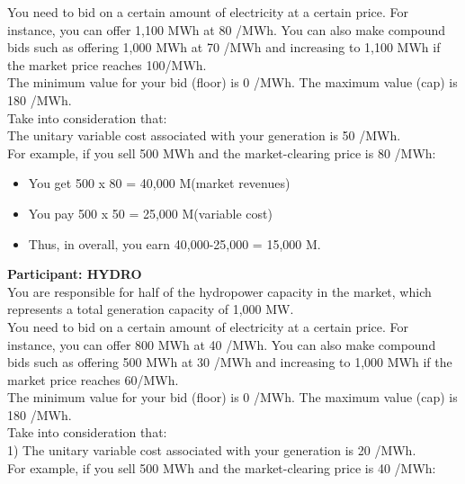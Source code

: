 \documentclass[3p]{elsarticle} %
\begin{document}
You need to bid on a certain amount of electricity at a certain price. For instance, you can offer 1,100 MWh at 80 \EUR/MWh. You can also make compound bids such as offering 1,000 MWh at 70 \EUR/MWh and increasing to 1,100 MWh if the market price reaches 100\EUR/MWh.\\

The minimum value for your bid (floor) is 0 \EUR/MWh. The maximum value (cap) is 180 \EUR/MWh. \\

Take into consideration that: \\

The unitary variable cost associated with your generation is 50 \EUR/MWh.\\

For example, if you sell 500 MWh and the market-clearing price is 80 \EUR/MWh:

\begin{itemize}
\item You get 500 x 80 = 40,000 M\EUR (market revenues)
\item You pay 500 x 50 = 25,000 M\EUR (variable cost)
\item Thus, in overall, you earn 40,000-25,000 = 15,000 M\EUR.
\end{itemize}

\newpage

\textbf{Participant: HYDRO} \\

You are responsible for half of the hydropower capacity in the market, which represents a total generation capacity of 1,000 MW. \\

You need to bid on a certain amount of electricity at a certain price. For instance, you can offer 800 MWh at 40 \EUR/MWh. You can also make compound bids such as offering 500 MWh at 30 \EUR/MWh and increasing to 1,000 MWh if the market price reaches 60\EUR/MWh. \\

The minimum value for your bid (floor) is 0 \EUR/MWh. The maximum value (cap) is 180 \EUR/MWh. \\

Take into consideration that: \\

1)	The unitary variable cost associated with your generation is 20 \EUR/MWh. \\

For example, if you sell 500 MWh and the market-clearing price is 40 \EUR/MWh:
\end{document}

